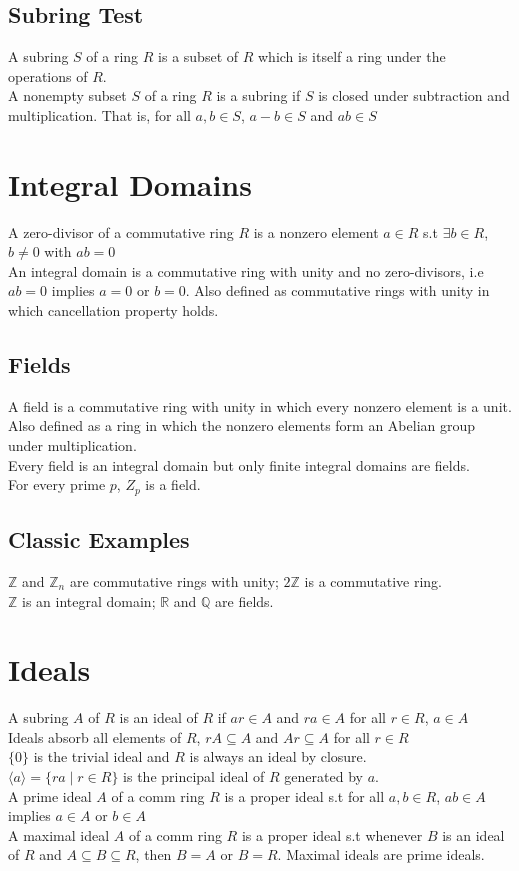 \documentclass{article}
\begin{document}
\subsection{Subring Test}
A subring $S$ of a ring $R$ is a subset of $R$ which is itself a ring under the operations of $R$.\\
A nonempty subset $S$ of a ring $R$ is a subring if $S$ is closed under subtraction and multiplication. That is, for all $a, b \in S$, $a-b \in S$ and $ab \in S$


\section{Integral Domains}
A zero-divisor of a commutative ring $R$ is a nonzero element $a \in R$ s.t $\exists b \in R$, $b \neq 0$ with $ab=0$ \\
An integral domain is a commutative ring with unity and no zero-divisors, i.e $ab=0$ implies $a=0$ or $b=0$. Also defined as commutative rings with unity in which cancellation property holds. 
\subsection{Fields}
A field is a commutative ring with unity in which every nonzero element is a unit. Also defined as a ring in which the nonzero elements form an Abelian group under multiplication. \\
Every field is an integral domain but only finite integral domains are fields. \\
For every prime $p$, $Z_p$ is a field. 
\subsection{Classic Examples}
$\mathbb{Z}$ and $\mathbb{Z}_n$ are commutative rings with unity; $2\mathbb{Z}$ is a commutative ring. \\
$\mathbb{Z}$ is an integral domain; $\mathbb{R}$ and $\mathbb{Q}$ are fields.


\section{Ideals}
A subring $A$ of $R$ is an ideal of $R$ if $ar \in A$ and $ra \in A$ for all $r \in R$, $a \in A$ \\
Ideals absorb all elements of $R$, $rA \subseteq A$ and $Ar \subseteq A$ for all $r \in R$ \\
$\{0\}$ is the trivial ideal and $R$ is always an ideal by closure. \\
$\langle a\rangle = \{ra \mid r \in R\}$ is the principal ideal of $R$ generated by $a$. \\
A prime ideal $A$ of a comm ring $R$ is a proper ideal s.t for all $a, b \in R$, $ab \in A$ implies $a \in A \text{ or } b \in A$ \\
A maximal ideal $A$ of a comm ring $R$ is a proper ideal s.t whenever $B$ is an ideal of $R$ and $ A \subseteq B \subseteq R$, then $B = A$ or $B = R$. Maximal ideals are prime ideals.
\end{document}
